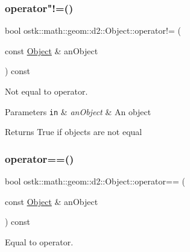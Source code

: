 \mbox{\label{classostk_1_1math_1_1geom_1_1d2_1_1_object_a10e035f09ac34d04901485d494681ff6}} 
\subsubsection{\texorpdfstring{operator"!=()}{operator!=()}}
{\footnotesize\ttfamily bool ostk\+::math\+::geom\+::d2\+::\+Object\+::operator!= (\begin{DoxyParamCaption}\item[{const \hyperlink{classostk_1_1math_1_1geom_1_1d2_1_1_object}{Object} \&}]{an\+Object }\end{DoxyParamCaption}) const}



Not equal to operator. 


\begin{DoxyParams}[1]{Parameters}
\mbox{\tt in}  & {\em an\+Object} & An object \\
\hline
\end{DoxyParams}
\begin{DoxyReturn}{Returns}
True if objects are not equal 
\end{DoxyReturn}
\mbox{\label{classostk_1_1math_1_1geom_1_1d2_1_1_object_aa26e3719b4b10fc5c65d047a91cf0f51}} 
\subsubsection{\texorpdfstring{operator==()}{operator==()}}
{\footnotesize\ttfamily bool ostk\+::math\+::geom\+::d2\+::\+Object\+::operator== (\begin{DoxyParamCaption}\item[{const \hyperlink{classostk_1_1math_1_1geom_1_1d2_1_1_object}{Object} \&}]{an\+Object }\end{DoxyParamCaption}) const}



Equal to operator. 


